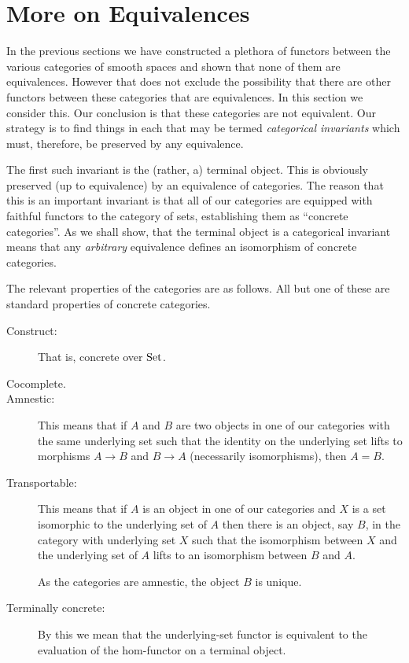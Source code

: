 \documentclass[%
12pt,%
arxiv,%
defaults
]{myclass}
\begin{document}
\section{More on Equivalences}
\label{sec:equiv}

In the previous sections we have constructed a plethora of functors between the various categories of smooth spaces and shown that none of them are equivalences.
However that does not exclude the possibility that there are other functors between these categories that are equivalences.
In this section we consider this.
Our conclusion is that these categories are not equivalent.
Our strategy is to find things in each that may be termed \emph{categorical invariants} which must, therefore, be preserved by any equivalence.

The first such invariant is the (rather, a) terminal object.
This is obviously preserved (up to equivalence) by an equivalence of categories.
The reason that this is an important invariant is that all of our categories are equipped with faithful functors to the category of sets, establishing them as ``concrete categories''.
As we shall show, that the terminal object is a categorical invariant means that any \emph{arbitrary} equivalence defines an isomorphism of concrete categories.

The relevant properties of the categories are as follows.
All but one of these are standard properties of concrete categories.
%
\begin{description}
\item[Construct:] That is, concrete over \(\operatorname{Set}\).

\item[Cocomplete.]

\item[Amnestic:] This means that if \(A\) and \(B\) are two objects in one of our categories with the same underlying set such that the identity on the underlying set lifts to morphisms \(A \to B\) and \(B \to A\) (necessarily isomorphisms), then \(A = B\).

\item[Transportable:] This means that if \(A\) is an object in one of our categories and \(X\) is a set isomorphic to the underlying set of \(A\) then there is an object, say \(B\), in the category with underlying set \(X\) such that the isomorphism between \(X\) and the underlying set of \(A\) lifts to an isomorphism between \(B\) and \(A\).

As the categories are amnestic, the object \(B\) is unique.

\item[Terminally concrete:] By this we mean that the underlying\hyp{}set functor is equivalent to the evaluation of the hom\hyp{}functor on a terminal object.
\end{description}
\end{document}
